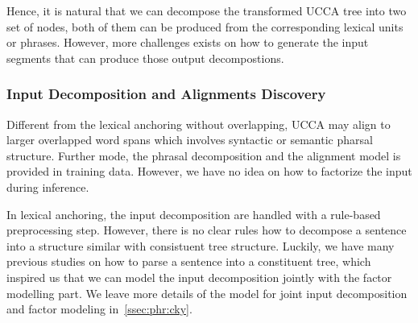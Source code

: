 Hence, it is natural that we can decompose the transformed UCCA tree
into two set of nodes, both of them can be produced from the
corresponding lexical units or phrases. However, more challenges
exists on how to generate the input segments that can produce those
output decompostions.

\subsubsection{Input Decomposition and Alignments Discovery}
\label{sssec:lex-phr:phr-input-decomposition}
Different from the lexical anchoring without overlapping, UCCA may
align to larger overlapped word spans which involves syntactic or
semantic pharsal structure. Further mode, the phrasal decomposition
and the alignment model is provided in training data. However, we have
no idea on how to factorize the input during inference.

In lexical anchoring, the input decomposition are handled with a
rule-based preprocessing step. However, there is no clear rules how to
decompose a sentence into a structure similar with consistuent tree
structure. Luckily, we have many previous studies on how to parse a
sentence into a constituent tree, which inspired us that we can model
the input decomposition jointly with the factor modelling part. We
leave more details of the model for joint input decomposition and
factor modeling in~\autoref{ssec:phr:cky}.

